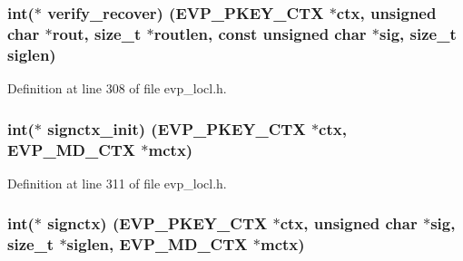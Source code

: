 \subsubsection[{\texorpdfstring{verify\+\_\+recover}{verify_recover}}]{\setlength{\rightskip}{0pt plus 5cm}int($\ast$ verify\+\_\+recover) ({\bf E\+V\+P\+\_\+\+P\+K\+E\+Y\+\_\+\+C\+TX} $\ast$ctx, unsigned char $\ast$rout, size\+\_\+t $\ast$routlen, const unsigned char $\ast$sig, size\+\_\+t siglen)}\hypertarget{structevp__pkey__method__st_a4827337053bddadd971e6eb8dd0adf00}{}\label{structevp__pkey__method__st_a4827337053bddadd971e6eb8dd0adf00}


Definition at line 308 of file evp\+\_\+locl.\+h.

\subsubsection[{\texorpdfstring{signctx\+\_\+init}{signctx_init}}]{\setlength{\rightskip}{0pt plus 5cm}int($\ast$ signctx\+\_\+init) ({\bf E\+V\+P\+\_\+\+P\+K\+E\+Y\+\_\+\+C\+TX} $\ast$ctx, {\bf E\+V\+P\+\_\+\+M\+D\+\_\+\+C\+TX} $\ast$mctx)}\hypertarget{structevp__pkey__method__st_a9fc3eed84c6c62be230843b0cf15f274}{}\label{structevp__pkey__method__st_a9fc3eed84c6c62be230843b0cf15f274}


Definition at line 311 of file evp\+\_\+locl.\+h.

\subsubsection[{\texorpdfstring{signctx}{signctx}}]{\setlength{\rightskip}{0pt plus 5cm}int($\ast$ signctx) ({\bf E\+V\+P\+\_\+\+P\+K\+E\+Y\+\_\+\+C\+TX} $\ast$ctx, unsigned char $\ast$sig, size\+\_\+t $\ast$siglen, {\bf E\+V\+P\+\_\+\+M\+D\+\_\+\+C\+TX} $\ast$mctx)}\hypertarget{structevp__pkey__method__st_a076e3385684612d4100af36fdf468f84}{}\label{structevp__pkey__method__st_a076e3385684612d4100af36fdf468f84}


